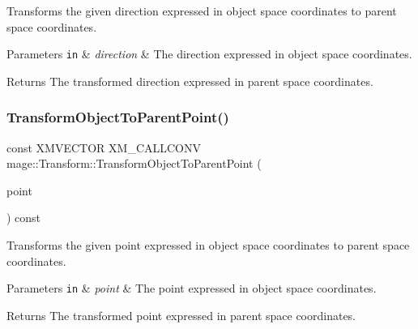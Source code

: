 Transforms the given direction expressed in object space coordinates to parent space coordinates.


\begin{DoxyParams}[1]{Parameters}
\mbox{\tt in}  & {\em direction} & The direction expressed in object space coordinates. \\
\hline
\end{DoxyParams}
\begin{DoxyReturn}{Returns}
The transformed direction expressed in parent space coordinates. 
\end{DoxyReturn}
\hypertarget{structmage_1_1_transform_a2d93dac4ae0b5b2723d2fbce077da85f}{}\label{structmage_1_1_transform_a2d93dac4ae0b5b2723d2fbce077da85f} 
\subsubsection{\texorpdfstring{Transform\+Object\+To\+Parent\+Point()}{TransformObjectToParentPoint()}}
{\footnotesize\ttfamily const X\+M\+V\+E\+C\+T\+OR X\+M\+\_\+\+C\+A\+L\+L\+C\+O\+NV mage\+::\+Transform\+::\+Transform\+Object\+To\+Parent\+Point (\begin{DoxyParamCaption}\item[{F\+X\+M\+V\+E\+C\+T\+OR}]{point }\end{DoxyParamCaption}) const\hspace{0.3cm}{\ttfamily [noexcept]}}

Transforms the given point expressed in object space coordinates to parent space coordinates.


\begin{DoxyParams}[1]{Parameters}
\mbox{\tt in}  & {\em point} & The point expressed in object space coordinates. \\
\hline
\end{DoxyParams}
\begin{DoxyReturn}{Returns}
The transformed point expressed in parent space coordinates. 
\end{DoxyReturn}
\hypertarget{structmage_1_1_transform_a305841f6bbc0a4eadaacbce2918b438c}{}\label{structmage_1_1_transform_a305841f6bbc0a4eadaacbce2918b438c} 
